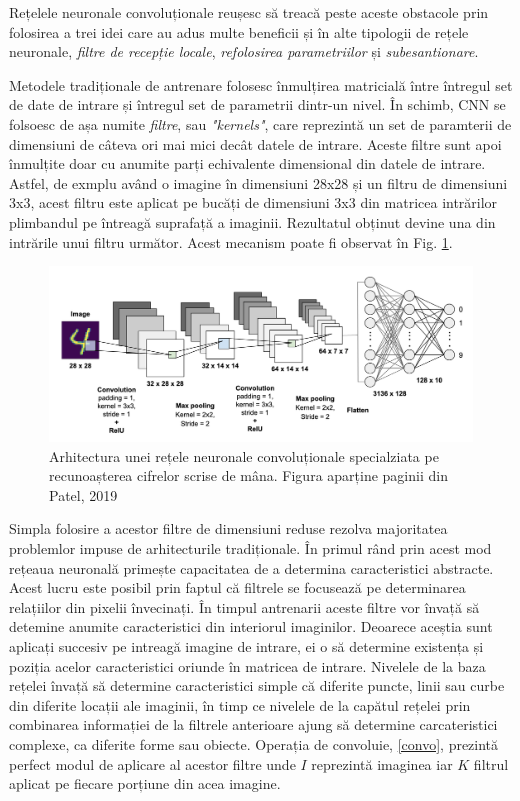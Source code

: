 \documentclass[a4paper,12pt]{book}
\begin{document}
				Rețelele neuronale convoluționale reușesc să treacă peste aceste obstacole prin folosirea a trei idei care au adus multe beneficii și în alte tipologii de rețele neuronale,\textit{ filtre de recepție locale}, \textit{refolosirea parametriilor} și \textit{subesantionare}. \par
				
				Metodele tradiționale de antrenare folosesc înmulțirea matricială între întregul set de date de intrare și întregul set de parametrii dintr-un nivel. În schimb, CNN se folsoesc de așa numite \textit{filtre}, sau \textit{"kernels"}, care reprezintă un set de paramterii de dimensiuni de câteva ori mai mici decât datele de intrare. Aceste filtre sunt apoi înmulțite doar cu anumite parți echivalente dimensional din datele de intrare. Astfel, de exmplu având o imagine în dimensiuni 28x28 și un filtru de dimensiuni 3x3, acest filtru este aplicat pe bucăți de dimensiuni 3x3 din matricea intrărilor plimbandul pe întreagă suprafață a imaginii. Rezultatul obținut devine una din intrările unui filtru următor. Acest mecanism poate fi observat în Fig. \ref{fig:cnns}.
					
				\begin{figure}[h]
					\centering
					\includegraphics[scale=0.23]{cnns}
					\caption{Arhitectura unei rețele neuronale convoluționale specialziata pe recunoașterea cifrelor scrise de mâna. Figura aparține paginii din Patel, 2019 \cite{cnn_photo}}
					\label{fig:cnns}
				\end{figure}
				
				Simpla folosire a acestor filtre de dimensiuni reduse rezolva majoritatea problemlor impuse de arhitecturile tradiționale. În primul rând prin acest mod rețeaua neuronală primește capacitatea de a determina caracteristici abstracte. Acest lucru este posibil prin faptul că filtrele se focusează pe determinarea relațiilor din pixelii învecinați. În timpul antrenarii aceste filtre vor învață să detemine anumite caracteristici din interiorul imaginilor. Deoarece aceștia sunt aplicați succesiv pe intreagă imagine de intrare, ei o să determine existența și poziția acelor caracteristici oriunde în matricea de intrare. Nivelele de la baza rețelei învață să determine caracteristici simple că diferite puncte, linii sau curbe din diferite locații ale imaginii, în timp ce nivelele de la capătul rețelei prin combinarea informației de la filtrele anterioare ajung să determine carcateristici complexe, ca diferite forme sau obiecte. Operația de convoluie, \ref{convo}, prezintă perfect modul de aplicare al acestor filtre unde $I$ reprezintă imaginea iar $K$ filtrul aplicat pe fiecare porțiune din acea imagine.\par
				
\end{document}
